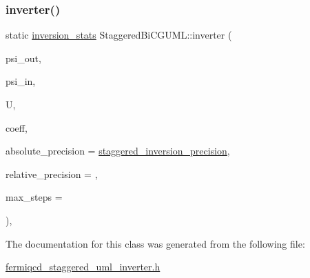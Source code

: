 \subsubsection{\texorpdfstring{inverter()}{inverter()}}
{\footnotesize\ttfamily static \hyperlink{classinversion__stats}{inversion\+\_\+stats} Staggered\+Bi\+C\+G\+U\+M\+L\+::inverter (\begin{DoxyParamCaption}\item[{\hyperlink{classstaggered__field}{staggered\+\_\+field} \&}]{psi\+\_\+out,  }\item[{\hyperlink{classstaggered__field}{staggered\+\_\+field} \&}]{psi\+\_\+in,  }\item[{\hyperlink{classgauge__field}{gauge\+\_\+field} \&}]{U,  }\item[{\hyperlink{classcoefficients}{coefficients} \&}]{coeff,  }\item[{\hyperlink{mdp__global__vars_8h_a69d96b74c791e0bbdb888b3913a69450}{mdp\+\_\+real}}]{absolute\+\_\+precision = {\ttfamily \hyperlink{fermiqcd__default__parameters_8h_ace2adee73e3f9d7c0df3759732b2688b}{staggered\+\_\+inversion\+\_\+precision}},  }\item[{\hyperlink{mdp__global__vars_8h_a69d96b74c791e0bbdb888b3913a69450}{mdp\+\_\+real}}]{relative\+\_\+precision = {},  }\item[{int}]{max\+\_\+steps = {} }\end{DoxyParamCaption})\hspace{0.3cm}{\ttfamily [inline]}, {\ttfamily [static]}}



The documentation for this class was generated from the following file\+:\begin{DoxyCompactItemize}
\item 
\hyperlink{fermiqcd__staggered__uml__inverter_8h}{fermiqcd\+\_\+staggered\+\_\+uml\+\_\+inverter.\+h}\end{DoxyCompactItemize}

